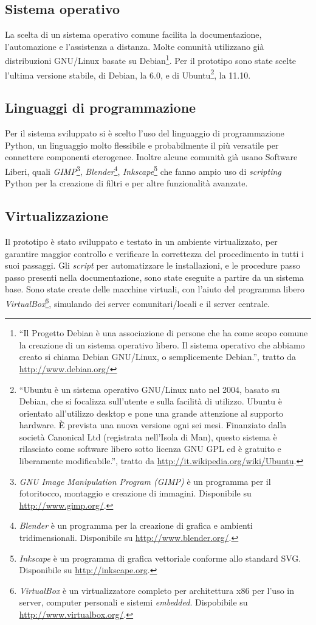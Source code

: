 \subsection{Sistema operativo}
La scelta di un sistema operativo comune facilita la documentazione,
l'automazione e l'assistenza a distanza. Molte comunità utilizzano già
distribuzioni GNU/Linux basate su Debian\footnote{``Il Progetto Debian
  è una associazione di persone che ha come scopo comune la creazione
  di un sistema operativo libero. Il sistema operativo che abbiamo
  creato si chiama Debian GNU/Linux, o semplicemente Debian.'', tratto
  da \url{http://www.debian.org/}}. Per il prototipo sono state scelte
l'ultima versione stabile, di Debian, la 6.0, e di
Ubuntu\footnote{``Ubuntu è un sistema operativo GNU/Linux nato nel
  2004, basato su Debian, che si focalizza sull'utente e sulla
  facilità di utilizzo. Ubuntu è orientato all'utilizzo desktop e pone
  una grande attenzione al supporto hardware. È prevista una nuova
  versione ogni sei mesi.  Finanziato dalla società Canonical Ltd
  (registrata nell'Isola di Man), questo sistema è rilasciato come
  software libero sotto licenza GNU GPL ed è gratuito e liberamente
  modificabile.'', tratto da
  \url{http://it.wikipedia.org/wiki/Ubuntu}.}, la 11.10.

\subsection{Linguaggi di programmazione}
Per il sistema sviluppato si è scelto l'uso del linguaggio di
programmazione Python, un linguaggio molto flessibile e probabilmente
il più versatile per connettere componenti eterogenee. Inoltre alcune
comunità già usano Software Liberi, quali
\emph{GIMP}\footnote{\emph{GNU Image Manipulation Program (GIMP)} è un
  programma per il fotoritocco, montaggio e creazione di
  immagini. Disponibile su \url{http://www.gimp.org/}.},
\emph{Blender}\footnote{\emph{Blender} è un programma per la creazione
  di grafica e ambienti tridimensionali. Disponibile su
  \url{http://www.blender.org/}.},
\emph{Inkscape}\footnote{\emph{Inkscape} è un programma di grafica
  vettoriale conforme allo standard SVG. Disponibile su
  \url{http://inkscape.org}.} che fanno ampio uso di \emph{scripting}
Python per la creazione di filtri e per altre funzionalità avanzate.

\subsection{Virtualizzazione}
Il prototipo è stato sviluppato e testato in un ambiente
virtualizzato, per garantire maggior controllo e verificare la
correttezza del procedimento in tutti i suoi passaggi. Gli
\emph{script} per automatizzare le installazioni, e le procedure passo
passo presenti nella documentazione, sono state eseguite a partire da
un sistema base. Sono state create delle macchine virtuali, con
l'aiuto del programma libero
\emph{VirtualBox}\footnote{\emph{VirtualBox} è un virtualizzatore
  completo per architettura x86 per l'uso in server, computer
  personali e sistemi \emph{embedded}. Dispobibile su
  \url{http://www.virtualbox.org/}.}, simulando dei server
comunitari/locali e il server centrale.


